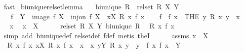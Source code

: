 \begin{isabellebody}
\ fast%
\endisatagproof
{\isafoldproof}%
%
\isadelimproof
\isanewline
%
\endisadelimproof
\isanewline
{}\isamarkupfalse%
\ bi{\isacharunderscore}{\kern0pt}unique{\isacharunderscore}{\kern0pt}rel{\isacharunderscore}{\kern0pt}set{\isacharunderscore}{\kern0pt}lemma{\isacharcolon}{\kern0pt}\isanewline
\ \ \ {\isachardoublequoteopen}bi{\isacharunderscore}{\kern0pt}unique\ R{\isachardoublequoteclose}\ \ {\isachardoublequoteopen}rel{\isacharunderscore}{\kern0pt}set\ R\ X\ Y{\isachardoublequoteclose}\isanewline
\ \ \ f\ \ {\isachardoublequoteopen}Y\ {\isacharequal}{\kern0pt}\ image\ f\ X{\isachardoublequoteclose}\ \ {\isachardoublequoteopen}inj{\isacharunderscore}{\kern0pt}on\ f\ X{\isachardoublequoteclose}\ \ {\isachardoublequoteopen}{\isasymforall}x{\isasymin}X{\isachardot}{\kern0pt}\ R\ x\ {\isacharparenleft}{\kern0pt}f\ x{\isacharparenright}{\kern0pt}{\isachardoublequoteclose}\isanewline
%
\isadelimproof
%
\endisadelimproof
%
\isatagproof
{}\isamarkupfalse%
\isanewline
\ \ \isamarkupfalse%
\ f\ \ {\isachardoublequoteopen}f\ x\ {\isacharequal}{\kern0pt}\ {\isacharparenleft}{\kern0pt}THE\ y{\isachardot}{\kern0pt}\ R\ x\ y{\isacharparenright}{\kern0pt}{\isachardoublequoteclose}\ \ x\isanewline
\ \ \isacommand{{\isacharbraceleft}{\kern0pt}}\isamarkupfalse%
\ \isamarkupfalse%
\ x\ \isamarkupfalse%
\ {\isachardoublequoteopen}x\ {\isasymin}\ X{\isachardoublequoteclose}\isanewline
\ \ \ \ \isamarkupfalse%
\ {\isacartoucheopen}rel{\isacharunderscore}{\kern0pt}set\ R\ X\ Y{\isacartoucheclose}\ {\isacartoucheopen}bi{\isacharunderscore}{\kern0pt}unique\ R{\isacartoucheclose}\ \isamarkupfalse%
\ {\isachardoublequoteopen}R\ x\ {\isacharparenleft}{\kern0pt}f\ x{\isacharparenright}{\kern0pt}{\isachardoublequoteclose}\isanewline
\ \ \ \ \ \ \isamarkupfalse%
\ {\isacharparenleft}{\kern0pt}simp\ add{\isacharcolon}{\kern0pt}\ bi{\isacharunderscore}{\kern0pt}unique{\isacharunderscore}{\kern0pt}def\ rel{\isacharunderscore}{\kern0pt}set{\isacharunderscore}{\kern0pt}def\ f{\isacharunderscore}{\kern0pt}def{\isacharparenright}{\kern0pt}\ {\isacharparenleft}{\kern0pt}metis\ theI{\isacharparenright}{\kern0pt}\isanewline
\ \ \ \ \isamarkupfalse%
\ assms\ {\isacartoucheopen}x\ {\isasymin}\ X{\isacartoucheclose}\ \isanewline
\ \ \ \ \isamarkupfalse%
\ \ {\isachardoublequoteopen}R\ x\ {\isacharparenleft}{\kern0pt}f\ x{\isacharparenright}{\kern0pt}{\isachardoublequoteclose}\ {\isachardoublequoteopen}{\isasymforall}x{\isacharprime}{\kern0pt}{\isasymin}X{\isachardot}{\kern0pt}\ R\ x{\isacharprime}{\kern0pt}\ {\isacharparenleft}{\kern0pt}f\ x{\isacharparenright}{\kern0pt}\ {\isasymlongrightarrow}\ x\ {\isacharequal}{\kern0pt}\ x{\isacharprime}{\kern0pt}{\isachardoublequoteclose}\ {\isachardoublequoteopen}{\isasymforall}y{\isasymin}Y{\isachardot}{\kern0pt}\ R\ x\ y\ {\isasymlongrightarrow}\ y\ {\isacharequal}{\kern0pt}\ f\ x{\isachardoublequoteclose}\ {\isachardoublequoteopen}f\ x\ {\isasymin}\ Y{\isachardoublequoteclose}\isanewline

\end{isabellebody}
